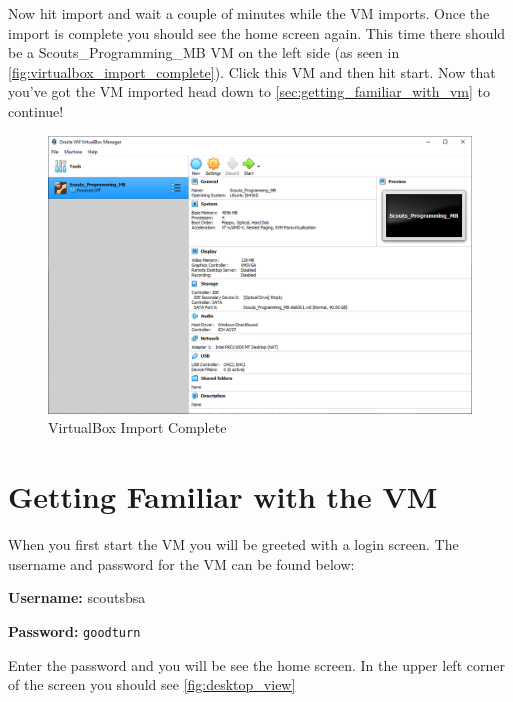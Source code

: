     Now hit import and wait a couple of minutes while the VM imports.
    Once the import is complete you should see the home screen again.
    This time there should be a Scouts\_Programming\_MB VM on the left side (as seen in \autoref{fig:virtualbox_import_complete}).
    Click this VM and then hit start.
    Now that you've got the VM imported head down to \autoref{sec:getting_familiar_with_vm} to continue!

    \begin{figure}[ht]
      \centering
      \includegraphics[width=0.8\linewidth]{virtualbox_import_complete.png}
      \caption{VirtualBox Import Complete}
      \label{fig:virtualbox_import_complete}
    \end{figure}
    \FloatBarrier

  \section{Getting Familiar with the VM}
  \label{sec:getting_familiar_with_vm}

    When you first start the VM you will be greeted with a login screen.
    The username and password for the VM can be found below:


    \vspace{5pt}
    \begin{mdframed}[]
      \textbf{Username:} scoutsbsa

      \textbf{Password:} \texttt{goodturn} 
    \end{mdframed}

    Enter the password and you will be see the home screen.
    In the upper left corner of the screen you should see \autoref{fig:desktop_view}

